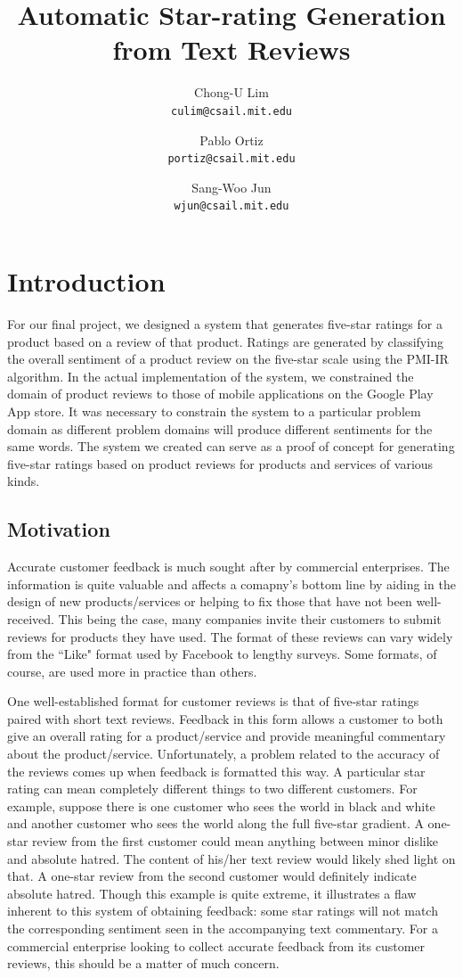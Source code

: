 \documentclass[11pt]{report} %
\title{Automatic Star-rating Generation from Text Reviews}
\author{
  Chong-U Lim\\
  \texttt{culim@csail.mit.edu}
  \and
  Pablo Ortiz\\
  \texttt{portiz@csail.mit.edu}
  \and
 Sang-Woo Jun\\
  \texttt{wjun@csail.mit.edu}
}
\begin{document}
\maketitle

\tableofcontents

\newpage
\chapter{Introduction}
For our final project, we designed a system that generates five-star ratings for a product based on a review of that product. Ratings are generated by classifying the overall sentiment of a product review on the five-star scale using the PMI-IR algorithm. In the actual implementation of the system, we constrained the domain of product reviews to those of mobile applications on the Google Play App store. It was necessary to constrain the system to a particular problem domain as different problem domains will produce different sentiments for the same words. The system we created can serve as a proof of concept for generating five-star ratings based on product reviews for products and services of various kinds.

\section{Motivation}


Accurate customer feedback is much sought after by commercial enterprises. The information is quite valuable and affects a comapny's bottom line by aiding in the design of new products/services or helping to fix those that have not been well-received. This being the  case, many companies invite their customers to submit reviews for products they have used. The format of these reviews can vary widely from the ``Like" format used by Facebook to lengthy surveys. Some formats, of course, are used more in practice than others.


One well-established format for customer reviews is that of five-star ratings paired with short text reviews. Feedback in this form allows a customer to both give an overall rating for a product/service and provide meaningful commentary about the product/service. Unfortunately, a problem related to the accuracy of the reviews comes up when feedback is formatted this way. A particular star rating can mean completely different things to two different customers. For example, suppose there is one customer who sees the world in black and white and another customer who sees the world along the full five-star gradient. A one-star review from the first customer could mean anything between minor dislike and absolute hatred. The content of his/her text review would likely shed light on that. A one-star review from the second customer would definitely indicate absolute hatred. Though this example is quite extreme, it illustrates a flaw inherent to this system of obtaining feedback: some star ratings will not match the corresponding sentiment seen in the accompanying text commentary. For a commercial enterprise looking to collect accurate feedback from its customer reviews, this should be a matter of much concern.
\end{document}
